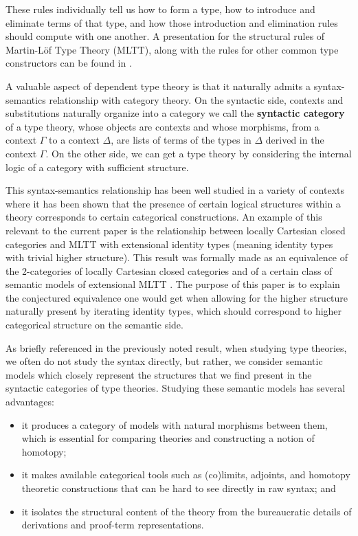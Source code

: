\documentclass{amsart}
\begin{document}
These rules individually tell us how to form a type, how to introduce and eliminate terms of that type, and how those introduction and elimination rules should compute with one another. A presentation for the structural rules of Martin-L\"of Type Theory (MLTT), along with the rules for other common type constructors can be found in \cite[Appendix A]{KL21}.

A valuable aspect of dependent type theory is that it naturally admits a syntax-semantics relationship with category theory. On the syntactic side, contexts and substitutions naturally organize into a category we call the \textbf{syntactic category} of a type theory, whose objects are contexts and whose morphisms, from a context $\Gamma$ to a context $\Delta$, are lists of terms of the types in $\Delta$ derived in the context $\Gamma$. On the other side, we can get a type theory by considering the internal logic of a category with sufficient structure.

This syntax-semantics relationship has been well studied in a variety of contexts where it has been shown that the presence of certain logical structures within a theory corresponds to certain categorical constructions. An example of this relevant to the current paper is the relationship between locally Cartesian closed categories and MLTT with extensional identity types (meaning identity types with trivial higher structure). This result was formally made as an equivalence of the 2-categories of locally Cartesian closed categories and of a certain class of semantic models of extensional MLTT \cite{CD}. The purpose of this paper is to explain the conjectured equivalence one would get when allowing for the higher structure naturally present by iterating identity types, which should correspond to higher categorical structure on the semantic side.

As briefly referenced in the previously noted result, when studying type theories, we often do not study the syntax directly, but rather, we consider semantic models which closely represent the structures that we find present in the syntactic categories of type theories. Studying these semantic models has several advantages:
\begin{itemize}
    \item it produces a category of models with natural morphisms between them, which is essential for comparing theories and constructing a notion of homotopy;
    \item it makes available categorical tools such as (co)limits, adjoints, and homotopy theoretic constructions that can be hard to see directly in raw syntax; and
    \item it isolates the structural content of the theory from the bureaucratic details of derivations and proof-term representations.
\end{itemize}
\end{document}
